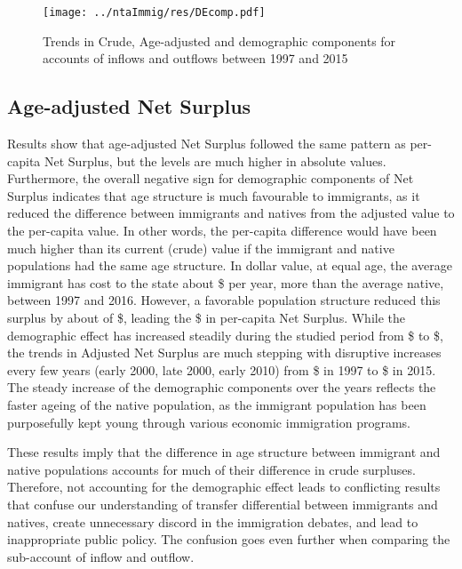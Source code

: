\begin{figure}[H]%
  \caption{Trends in Crude, Age-adjusted and demographic components for accounts of inflows and outflows between 1997 and 2015 }
  \texttt{[image: ../ntaImmig/res/DEcomp.pdf]}%
  \label{fig:DEcomp}%
\end{figure}%

\subsection{Age-adjusted Net Surplus}

Results show that age-adjusted Net Surplus followed the same pattern as per-capita Net Surplus, but the levels are much higher in absolute values.
Furthermore, the overall negative sign for demographic components of Net Surplus indicates that age structure is much favourable to immigrants, as it reduced the difference between immigrants and natives from the adjusted value to the per-capita value.
In other words, the per-capita difference would have been much higher than its current (crude) value if the immigrant and native populations had the same age structure.
In dollar value, at equal age, the average immigrant has cost to the state about \$ per year, more than the average native, between 1997 and 2016.
However, a favorable population structure reduced this surplus by about of \$, leading the  \$ in per-capita Net Surplus.
While the demographic effect has increased steadily during the studied period from \$ to \$, the trends in Adjusted Net Surplus are much stepping with disruptive increases every few years (early 2000, late 2000, early 2010) from \$ in 1997 to \$ in 2015.
The steady increase of the demographic components over the years reflects the faster ageing of the native population, as the immigrant population has been purposefully kept young through various economic immigration programs.

\vspace{0.7em}\par
These results imply that the difference in age structure between immigrant and native populations accounts for much of their difference in crude surpluses.
Therefore, not accounting for the demographic effect leads to conflicting results that confuse our understanding of transfer differential between immigrants and natives, create unnecessary discord in the immigration debates, and lead to inappropriate public policy.
The confusion goes even further when comparing the sub-account of inflow and outflow.

